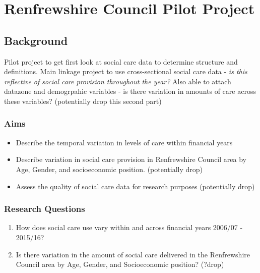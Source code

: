 \documentclass[12pt,]{report}
\providecommand{\tightlist}{%
  \setlength{\itemsep}{0pt}\setlength{\parskip}{0pt}}
\begin{document}
\FloatBarrier
\newpage
{}

\chapter{Renfrewshire Council Pilot Project}\label{ch:renfrew}

\section{Background}\label{sec:renf-background}

Pilot project to get first look at social care data to determine
structure and definitions. Main linkage project to use cross-sectional
social care data -
\emph{is this reflective of social care provision throughout the year?}
Also able to attach datazone and demogrpahic variables - is there
variation in amounts of care across these variables? (potentially drop
this second part)

\subsection{Aims}\label{subsec:renfrew-aims}

\begin{itemize}
\tightlist
\item
  Describe the temporal variation in levels of care within financial
  years
\item
  Describe variation in social care provision in Renfrewshire Council
  area by Age, Gender, and socioeconomic position. (potentially drop)
\item
  Assess the quality of social care data for research purposes
  (potentially drop)
\end{itemize}

\subsection{Research Questions}\label{subsec:renfrew-qs}

\begin{enumerate}[noitemsep]
\item How does social care use vary within and across financial years 2006/07 - 2015/16?
\item Is there variation in the amount of social care delivered in the Renfrewshire Council area by Age, Gender, and Socioeconomic position? (?drop)
\end{enumerate}
\end{document}
